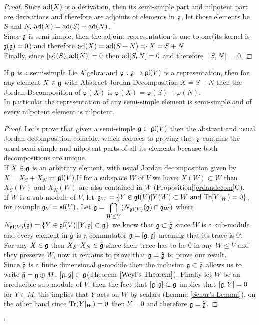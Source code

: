 \begin{proof}
Since $\text{ad}(X)$ is a derivation, then its semi-simple part and nilpotent part are derivations and therefore are adjoints of elements in $\mathfrak{g}$, let those elements be $S$ and $N$, $\text{ad}(X)=\text{ad}(S)+\text{ad}(N)$.\\
Since $\mathfrak{g}$ is semi-simple, then the adjoint representation is one-to-one(its kernel is $\mathfrak{z}(\mathfrak{g})=0$) and therefore $\text{ad}(X)=\text{ad}(S+N) \Rightarrow X=S+N$\\
Finally, since $[\text{ad}(S),\text{ad}(N)]=0$ then $\text{ad}[S,N]=0$ and therefore $[S,N]=0$.
\end{proof}
\begin{prop}
	If $\mathfrak{g}$ is a semi-simple Lie Algebra and $\varphi:\mathfrak{g} \rightarrow \mathfrak{gl}(V)$ is a representation, then for any element $X \in \mathfrak{g}$ with Abstract Jordan Decomposition $X=S+N$ then the Jordan Decomposition of $\varphi(X)$ is $\varphi(X)=\varphi(S)+\varphi(N)$.\\
	In particular the representation of any semi-simple element is semi-simple and of every nilpotent element is nilpotent.
	\label{PreservationOfAbsJordan} 
\end{prop}
\begin{proof}
	Let's prove that given a semi-simple $\mathfrak{g} \subset \mathfrak{gl}(V)$ then the abstract and usual Jordan decomposition coincide, which reduces to proving that $\mathfrak{g}$ contains the usual semi-simple and nilpotent parts of all its elements because both decompositions are unique.\\
	If $X \in \mathfrak{g}$ is an arbitrary element, with usual Jordan decomposition given by $X=X_S+X_N$ in $\mathfrak{gl}(V)$.If for a subspace $W$ of $V$ we have: $X(W)\subset W$ then $X_S(W)$ and $X_N(W)$ are also contained in $W$ (Proposition\ref{jordandecom}C).\\
	If $W$ is a sub-module of $V$, let $\mathfrak{g}_W = \{Y \in \mathfrak{gl}(V)|Y(W)\subset W \text{ and } \text{Tr}(Y|_{W})=0\}$, for example $\mathfrak{g}_V = \mathfrak{sl}(V)$. Let $\tilde{\mathfrak{g}}=\displaystyle\bigcap_{W\le V} (N_{\mathfrak{gl}(V)}(\mathfrak{g}) \cap \mathfrak{g}_W)$ where $N_{\mathfrak{gl}(V)}(\mathfrak{g}) = \{Y \in \mathfrak{gl}(V)| [Y,\mathfrak{g}]\subset \mathfrak{g}\}$ we know that $\mathfrak{g}\subset \tilde{\mathfrak{g}}$ since $W$ is a sub-module and every element in $\mathfrak{g}$ is a commutator $\mathfrak{g}=[\mathfrak{g},\mathfrak{g}]$ meaning that its trace is $0$`.\\
	For any $X \in \mathfrak{g}$ then $X_S,X_N \in \tilde{\mathfrak{g}}$ since their trace has to be $0$ in any $W\le V$ and they preserve $W$, now it remains to prove that $\mathfrak{g}=\tilde{\mathfrak{g}}$ to prove our result.\\
	Since $\tilde{\mathfrak{g}}$ is a finite dimensional $\mathfrak{g}$-module then the inclusion $\mathfrak{g} \subset \tilde{\mathfrak{g}}$ allows us to write $\tilde{\mathfrak{g}} = \mathfrak{g} \oplus M$. $[\mathfrak{g},\tilde{\mathfrak{g}}]\subset \mathfrak{g}$(Theorem $\ref{Weyl's Theorem}$). Finally let $W$ be an irreducible sub-module of $V$, then the fact that $[\mathfrak{g},\tilde{\mathfrak{g}}]\subset \mathfrak{g}$ implies that $[\mathfrak{g},Y]=0$ for $Y \in M$, this implies that $Y$ acts on $W$ by scalars (Lemma \ref{Schur's Lemma}), on the other hand since $\text{Tr}(Y|_W)=0$ then $Y=0$ and therefore $\mathfrak{g} = \tilde{\mathfrak{g}}$.
\end{proof}
`